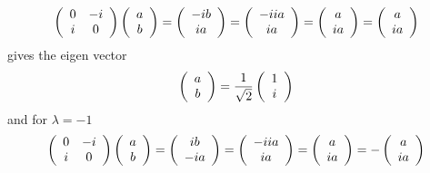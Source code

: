 \documentclass[aps,preprint]{revtex4}%
\begin{document}
\begin{equation}
\left(
\begin{array}
[c]{cc}%
0 & -i\\
i & 0
\end{array}
\right)  \left(
\begin{array}
[c]{c}%
a\\
b
\end{array}
\right)  =\left(
\begin{array}
[c]{c}%
-ib\\
ia
\end{array}
\right)  =\left(
\begin{array}
[c]{c}%
-iia\\
ia
\end{array}
\right)  =\left(
\begin{array}
[c]{c}%
a\\
ia
\end{array}
\right)  =\left(
\begin{array}
[c]{c}%
a\\
ia
\end{array}
\right)
\end{equation}
gives the eigen vector
\begin{equation}
\left(
\begin{array}
[c]{c}%
a\\
b
\end{array}
\right)  =\frac{1}{\sqrt{2}}\left(
\begin{array}
[c]{c}%
1\\
i
\end{array}
\right)
\end{equation}
and for $\lambda=-1$
\begin{equation}
\left(
\begin{array}
[c]{cc}%
0 & -i\\
i & 0
\end{array}
\right)  \left(
\begin{array}
[c]{c}%
a\\
b
\end{array}
\right)  =\left(
\begin{array}
[c]{c}%
ib\\
-ia
\end{array}
\right)  =\left(
\begin{array}
[c]{c}%
-iia\\
ia
\end{array}
\right)  =\left(
\begin{array}
[c]{c}%
a\\
ia
\end{array}
\right)  =-\left(
\begin{array}
[c]{c}%
a\\
ia
\end{array}
\right)
\end{equation}
\end{document}
